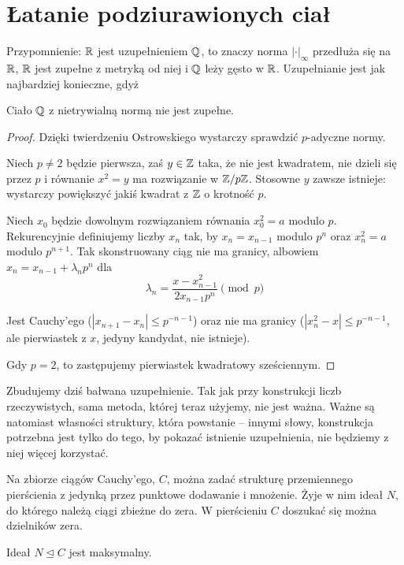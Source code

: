 \section{Łatanie podziurawionych ciał}
Przypomnienie:  $\mathbb R$ jest uzupełnieniem $\mathbb Q$, to znaczy norma $|\cdot|_\infty$ przedłuża się na $\mathbb R$, $\mathbb R$ jest zupełne z metryką od niej i $\mathbb Q$ leży gęsto w $\mathbb R$. Uzupełnianie jest jak najbardziej konieczne, gdyż

\begin{lemat}
	Ciało $\mathbb Q$ z nietrywialną normą nie jest zupełne.
\end{lemat}

\begin{proof}
	Dzięki twierdzeniu Ostrowskiego wystarczy sprawdzić $p$-adyczne normy.
	
	Niech $p \neq 2$ będzie pierwsza, zaś $y \in \mathbb Z$ taka, że nie jest kwadratem, nie dzieli się przez $p$ i równanie $x^2 = y$ ma rozwiązanie w $\mathbb Z/p\mathbb Z$.
	Stosowne $y$ zawsze istnieje: wystarczy powiększyć jakiś kwadrat z $\mathbb Z$ o krotność $p$.
	
	Niech $x_0$ będzie dowolnym rozwiązaniem równania $x_0^2 = a$ modulo $p$.
	Rekurencyjnie definiujemy liczby $x_n$ tak, by $x_n = x_{n-1}$ modulo $p^n$ oraz $x_n^2 = a$ modulo $p^{n+1}$.
	Tak skonstruowany ciąg nie ma granicy, albowiem $x_n = x_{n-1} + \lambda_n p^n$ dla
	\[
		\lambda_n = \frac{x - x_{n-1}^2}{2x_{n-1} p^n} \pmod p
	\]
	
	Jest Cauchy'ego ($|x_{n+1} - x_n| \le p^{-n-1}$) oraz nie ma granicy ($|x_n^2 - x| \le p^{-n-1}$, ale pierwiastek z $x$, jedyny kandydat, nie istnieje).

	Gdy $p = 2$, to zastępujemy pierwiastek kwadratowy sześciennym.
\end{proof}

Zbudujemy dziś bałwana uzupełnienie. 
Tak jak przy konstrukcji liczb rzeczywistych, sama metoda, której teraz użyjemy, nie jest ważna.
Ważne są natomiast własności struktury, która powstanie -- innymi słowy, konstrukcja potrzebna jest tylko do tego, by pokazać istnienie uzupełnienia, nie będziemy z niej więcej korzystać.

Na zbiorze ciągów Cauchy'ego, $C$, można zadać strukturę przemiennego pierścienia z jedynką przez punktowe dodawanie i mnożenie.
Żyje w nim ideał $N$, do którego należą ciągi zbieżne do zera.
W pierścieniu $C$ doszukać się można dzielników zera.

\begin{lemat}
	Ideał $N \trianglelefteq C$ jest maksymalny.
\end{lemat}

